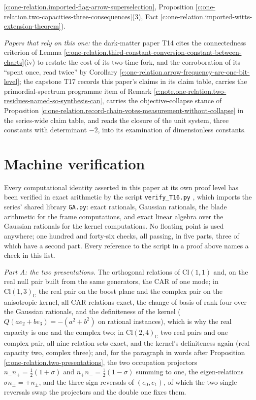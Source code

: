 \documentclass[11pt]{article}
\theoremstyle{definition}
\theoremstyle{plain}
\providecommand{\C}{}\renewcommand{\C}{\mathbb{C}}
\providecommand{\Cl}{}\renewcommand{\Cl}{\mathrm{Cl}}
\begin{document}
\ref{c:one-relation.imported-flag-arrow-superselection}, Proposition \ref{c:one-relation.two-capacities-three-consequences}(3), Fact \ref{c:one-relation.imported-witts-extension-theorem}).

\emph{Papers that rely on this one:} the dark-matter paper T14 \cite{ButlerT14} cites the connectedness criterion of Lemma \ref{c:one-relation.third-constant-conversion-constant-between-charts}(iv) to restate the cost of its two-time fork, and the corroboration of its ``spent once, read twice'' by Corollary \ref{c:one-relation.arrow-frequency-are-one-bit-level}; the capstone T17 \cite{ButlerT17} records this paper's claims in its claim table, carries the primordial-spectrum programme item of Remark \ref{c:note.one-relation.two-residues-named-so-synthesis-can}, carries the objective-collapse stance of Proposition \ref{c:one-relation.record-chain-votes-measurement-without-collapse} in the series-wide claim table, and reads the closure of the unit system, three constants with determinant $-2$, into its examination of dimensionless constants.

\section{Machine verification}

\label{c:note.one-relation.setting-machine-verification}
Every computational identity asserted in this paper at its own proof level has been verified in exact arithmetic by the script \texttt{verify\_T16.py} \cite{ButlerVerifyT16}, which imports the series' shared library \texttt{GA.py}: exact rationals, Gaussian rationals, the blade arithmetic for the frame computations, and exact linear algebra over the Gaussian rationals for the kernel computations. No floating point is used anywhere; one hundred and forty-six checks, all passing, in five parts, three of which have a second part. Every reference to the script in a proof above names a check in this list.

\emph{Part A: the two presentations.} The orthogonal relations of $\Cl(1,1)$ and, on the real null pair built from the same generators, the CAR of one mode; in $\Cl(1,3)_{\C}$ the real pair on the boost plane and the complex pair on the anisotropic kernel, all CAR relations exact, the change of basis of rank four over the Gaussian rationals, and the definiteness of the kernel ($Q(ae_{2} + be_{3}) = -(a^{2} + b^{2})$ on rational instances), which is why the real capacity is one and the complex two; in $\Cl(2,4)_{\C}$ two real pairs and one complex pair, all nine relation sets exact, and the kernel's definiteness again (real capacity two, complex three); and, for the paragraph in words after Proposition \ref{c:one-relation.two-presentations}, the two occupation projectors $n_{-}n_{+} = \tfrac12(1+\sigma)$ and $n_{+}n_{-} = \tfrac12(1-\sigma)$ summing to one, the eigen-relations $\sigma n_{\pm} = \mp n_{\pm}$, and the three sign reversals of $(e_{0}, e_{1})$, of which the two single reversals swap the projectors and the double one fixes them.
\end{document}
